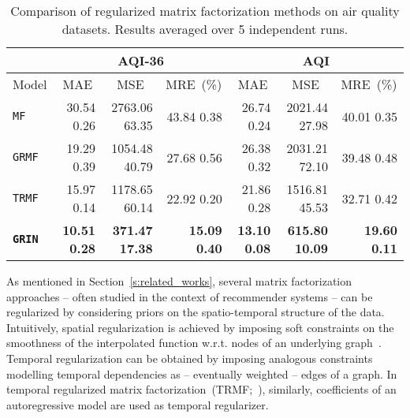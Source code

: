 \documentclass{article} \usepackage{iclr2022_conference,times}
\newcommand{\GRIL}{\texttt{GRIN}}
\begin{document}
\begin{table}[h]
\vspace{-0.2cm}
\caption{Comparison of regularized matrix factorization methods on air quality datasets. Results averaged over 5 independent runs.}
\vspace{0.1cm}
\centering
\begin{adjustbox}{max width=\textwidth}
\begin{tabular}{ l | r  r  r | r  r r }
\toprule
 \multicolumn{1}{c}{} &\multicolumn{3}{c}{AQI-36} & \multicolumn{3}{c}{AQI} \\
\toprule
 \multicolumn{1}{c}{Model}&\multicolumn{1}{|c}{\small MAE} & \multicolumn{1}{c}{\small MSE}  & \multicolumn{1}{c}{\small MRE~(\%)} & \multicolumn{1}{|c}{\small MAE} & \multicolumn{1}{c}{\small MSE} & \multicolumn{1}{c}{\small MRE~(\%)}\\
\midrule
\texttt{MF} & 30.54 {\tiny  0.26} & 2763.06 {\tiny  63.35} & 43.84 {\tiny  0.38} & 26.74 {\tiny  0.24} & 2021.44 {\tiny  27.98} & 40.01 {\tiny  0.35}\\
\texttt{GRMF} & 19.29 {\tiny  0.39} & 1054.48 {\tiny  40.79} & 27.68 {\tiny  0.56} & 26.38 {\tiny  0.32} & 2031.21 {\tiny  72.10} & 39.48 {\tiny  0.48}\\
\texttt{TRMF} & 15.97 {\tiny  0.14} & 1178.65 {\tiny  60.14} & 22.92 {\tiny  0.20} & 21.86 {\tiny  0.28} & 1516.81 {\tiny  45.53} & 32.71 {\tiny  0.42}\\
\midrule[0.3pt]
\texttt{\textbf{\GRIL}} & \textbf{10.51 {\tiny  0.28}} & \textbf{371.47 {\tiny  17.38}} & \textbf{15.09 {\tiny  0.40}} & \textbf{13.10 {\tiny  0.08}} & \textbf{615.80 {\tiny  10.09}} & \textbf{19.60 {\tiny  0.11}}\\
\bottomrule
\end{tabular}
\end{adjustbox}
\label{t:grmf}
\end{table} 
As mentioned in Section~\ref{s:related_works}, several matrix factorization approaches -- often studied in the context of recommender systems -- can be regularized by considering priors on the spatio-temporal structure of the data. Intuitively, spatial regularization is achieved by imposing soft constraints on the smoothness of the interpolated function w.r.t. nodes of an underlying graph~\citep{cai2010graph, rao2015collaborative}. Temporal regularization can be obtained by imposing analogous constraints modelling temporal dependencies as -- eventually weighted -- edges of a graph. In temporal regularized matrix factorization~(TRMF;~\citealp{yu2016temporal}), similarly, coefficients of an autoregressive model are used as temporal regularizer. 
\end{document}
